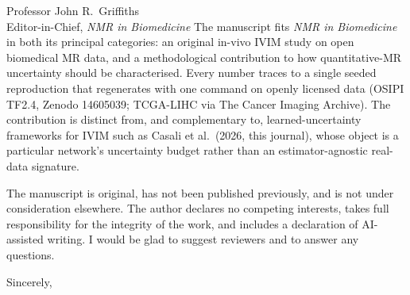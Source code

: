 \documentclass[11pt]{letter}
\begin{document}
\begin{letter}{Professor John R.\ Griffiths \\ Editor-in-Chief, \textit{NMR in Biomedicine}}
The manuscript fits \textit{NMR in Biomedicine} in both its principal categories:
an original in-vivo IVIM study on open biomedical MR data, and a methodological
contribution to how quantitative-MR uncertainty should be characterised. Every
number traces to a single seeded reproduction that regenerates with one command on
openly licensed data (OSIPI TF2.4, Zenodo 14605039; TCGA-LIHC via The Cancer
Imaging Archive). The contribution is distinct from, and complementary to,
learned-uncertainty frameworks for IVIM such as Casali et al.\ (2026, this
journal), whose object is a particular network's uncertainty budget rather than an
estimator-agnostic real-data signature.

The manuscript is original, has not been published previously, and is not under
consideration elsewhere. The author declares no competing interests, takes full
responsibility for the integrity of the work, and includes a declaration of
AI-assisted writing. I would be glad to suggest reviewers and to answer any
questions.

\closing{Sincerely,}
\end{letter}
\end{document}
